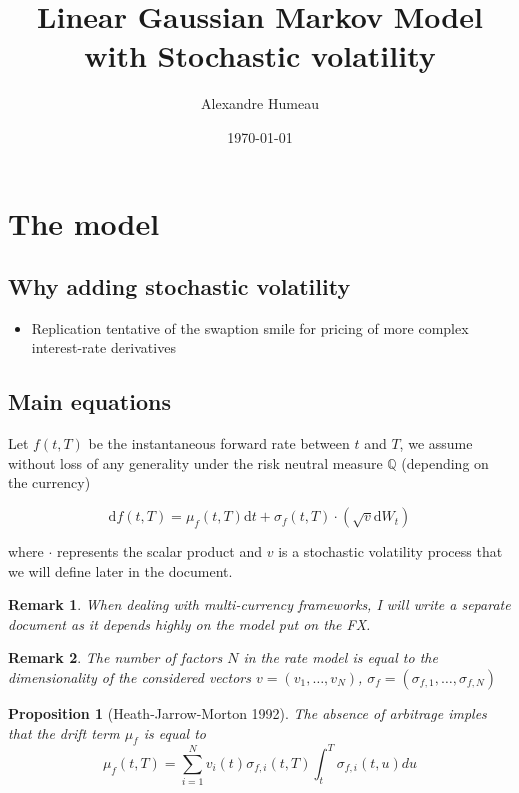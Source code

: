\documentclass{article}
\newtheorem{proposition}[theorem]{Proposition}
\newtheorem{remark}{Remark}[section]
\begin{document}
\title{Linear Gaussian Markov Model with Stochastic volatility}
\author{Alexandre Humeau}
\date{\today}
\maketitle

\section{The model}

\subsection{Why adding stochastic volatility}

\begin{itemize}
	\item Replication tentative of the swaption smile for pricing of more complex interest-rate derivatives
\end{itemize}

\subsection{Main equations}

Let $f(t,T)$ be the instantaneous forward rate between $t$ and $T$, we assume without loss of any generality under the risk neutral measure $\mathbb{Q}$ (depending on the currency)

\begin{equation}
	\mathrm{d}f(t,T) =\mu_f(t,T) \mathrm{d}t + \sigma_f(t,T) \cdot \left( \sqrt{v} \mathrm{d}W_t \right)
\end{equation}

\noindent where $\cdot$ represents the scalar product and $v$ is a stochastic volatility process that we will define later in the document.

\begin{remark}
	When dealing with multi-currency frameworks, I will write a separate document as it depends highly on the model put on the FX.
\end{remark}

\begin{remark}
	The number of factors $N$ in the rate model is equal to the dimensionality of the considered vectors $v = \left(v_1, \dots, v_N\right)$, $\sigma_f = \left(\sigma_{f,1}, \dots, \sigma_{f,N}\right)$
\end{remark}

\begin{proposition}[Heath-Jarrow-Morton 1992]
	The absence of arbitrage imples that the drift term $\mu_f$ is equal to 
	\begin{equation}
		\mu_f(t,T) = \sum_{i=1}^{N} v_i(t) \sigma_{f,i}(t,T) \int_t^T \sigma_{f,i}(t,u) du
	\end{equation}
\end{proposition}
\end{document}
